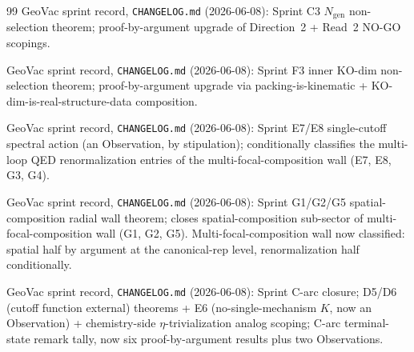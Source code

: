 \documentclass[11pt,a4paper]{article}
\theoremstyle{plain}
\theoremstyle{definition}
\begin{document}
\begin{thebibliography}{99}
GeoVac sprint record, \texttt{CHANGELOG.md} (2026-06-08):  Sprint C3 $N_{\mathrm{gen}}$ non-selection theorem; proof-by-argument upgrade of Direction~2 + Read~2 NO-GO scopings.

GeoVac sprint record, \texttt{CHANGELOG.md} (2026-06-08):  Sprint F3 inner KO-dim non-selection theorem; proof-by-argument upgrade via packing-is-kinematic + KO-dim-is-real-structure-data composition.

GeoVac sprint record, \texttt{CHANGELOG.md} (2026-06-08):  Sprint E7/E8 single-cutoff spectral action (an Observation, by stipulation);  conditionally classifies the multi-loop QED renormalization entries of the multi-focal-composition wall (E7, E8, G3, G4).

GeoVac sprint record, \texttt{CHANGELOG.md} (2026-06-08):  Sprint G1/G2/G5 spatial-composition radial wall theorem;  closes spatial-composition sub-sector of multi-focal-composition wall (G1, G2, G5).  Multi-focal-composition wall now classified: spatial half by argument at the canonical-rep level, renormalization half conditionally.

GeoVac sprint record, \texttt{CHANGELOG.md} (2026-06-08):  Sprint C-arc closure;  D5/D6 (cutoff function external) theorems + E6 (no-single-mechanism $K$, now an Observation) + chemistry-side $\eta$-trivialization analog scoping;  C-arc terminal-state remark tally, now six proof-by-argument results plus two Observations.

\end{thebibliography}
\end{document}
